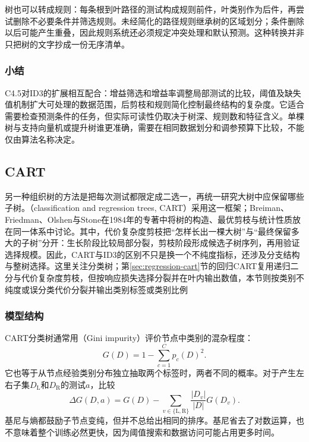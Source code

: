 树也可以转成规则：每条根到叶路径的测试构成规则前件，叶类别作为后件，再尝试删除不必要条件并筛选规则。未经简化的路径规则继承树的区域划分；条件删除以后可能产生重叠，因此规则系统还必须规定冲突处理和默认预测。这种转换并非只把树的文字抄成一份无序清单。

\subsubsection{小结}
\label{sec:classification-c45-summary}

C4.5对ID3的扩展相互配合：增益筛选和增益率调整局部测试的比较，阈值及缺失值机制扩大可处理的数据范围，后剪枝和规则简化控制最终结构的复杂度。它适合需要检查预测条件的任务，但实际可读性仍取决于树深、规则数和特征含义。单棵树与支持向量机或提升树谁更准确，需要在相同数据划分和调参预算下比较，不能仅由算法名称决定。

\subsection{CART}
\label{sec:classification-cart}

另一种组织树的方法是把每次测试都限定成二选一，再统一研究大树中应保留哪些子树。（classification and regression trees, CART）采用这一框架；Breiman、Friedman、Olshen与Stone在1984年的专著中将树的构造、最优剪枝与统计性质放在同一体系中讨论。其中，代价复杂度剪枝把“怎样长出一棵大树”与“最终保留多大的子树”分开：生长阶段比较局部分裂，剪枝阶段形成候选子树序列，再用验证选择规模。因此，CART与ID3的区别不只是换一个不纯度指标，还涉及分支结构与整树选择。这里关注分类树；第\ref{sec:regression-cart}节的回归CART复用递归二分与代价复杂度剪枝，但按响应损失选择分裂并在叶内输出数值，本节则按类别不纯度或误分类代价分裂并输出类别标签或类别比例

\subsubsection{模型结构}
\label{sec:classification-cart-structure}

CART分类树通常用（Gini impurity）评价节点中类别的混杂程度：
\begin{equation}
  G(D)=1-\sum_{c=1}^{C}p_c(D)^2.
  \label{eq:classification-gini}
\end{equation}
它也等于从节点经验类别分布独立抽取两个标签时，两者不同的概率。对于产生左右子集$D_{\mathrm{L}}$和$D_{\mathrm{R}}$的测试$a$，比较
\begin{equation}
  \Delta G(D,a)=G(D)
  -\sum_{v\in\{\mathrm{L},\mathrm{R}\}}
  \frac{|D_v|}{|D|}G(D_v).
  \label{eq:classification-gini-decrease}
\end{equation}
基尼与熵都鼓励子节点变纯，但并不总给出相同的排序。基尼省去了对数运算，也不意味着整个训练必然更快，因为阈值搜索和数据访问可能占用更多时间。

